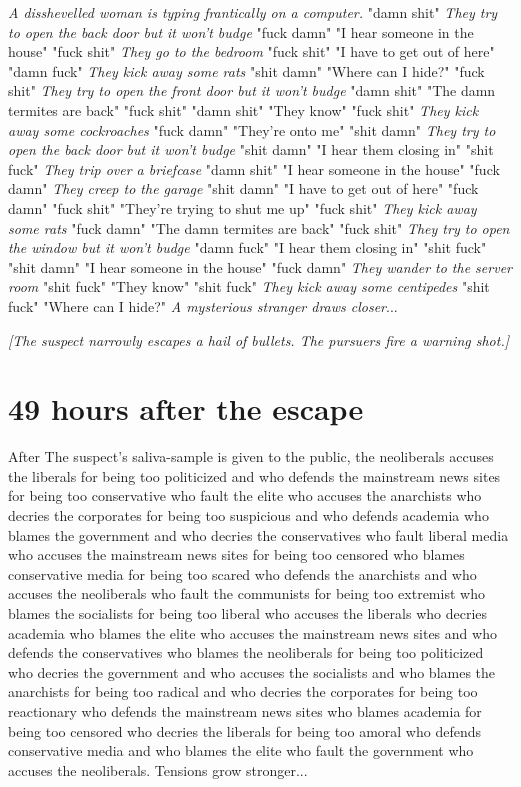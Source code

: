 \documentclass{report}
\begin{document}
\textit{A disshevelled woman is typing frantically on a computer.} "damn shit" \textit{They try to open the back door but it won't budge} "fuck damn" "I hear someone in the house" "fuck shit" \textit{They go to the bedroom} "fuck shit" "I have to get out of here" "damn fuck" \textit{They kick away some rats} "shit damn" "Where can I hide?" "fuck shit" \textit{They try to open the front door but it won't budge} "damn shit" "The damn termites are back" "fuck shit" \textit{} "damn shit" "They know" "fuck shit" \textit{They kick away some cockroaches} "fuck damn" "They're onto me" "shit damn" \textit{They try to open the back door but it won't budge} "shit damn" "I hear them closing in" "shit fuck" \textit{They trip over a briefcase} "damn shit" "I hear someone in the house" "fuck damn" \textit{They creep to the garage} "shit damn" "I have to get out of here" "fuck damn" \textit{} "fuck shit" "They're trying to shut me up" "fuck shit" \textit{They kick away some rats} "fuck damn" "The damn termites are back" "fuck shit" \textit{They try to open the window but it won't budge} "damn fuck" "I hear them closing in" "shit fuck" \textit{} "shit damn" "I hear someone in the house" "fuck damn" \textit{They wander to the server room} "shit fuck" "They know" "shit fuck" \textit{They kick away some centipedes} "shit fuck" "Where can I hide?" \textit{A mysterious stranger draws closer}...

\textit{[The suspect narrowly escapes a hail of bullets. The pursuers fire a warning shot.]}


\section*{49 \small{hours after the escape}}

After The suspect's saliva-sample is given to the public, the neoliberals accuses the liberals for being too politicized and who defends the mainstream news sites for being too conservative who fault the elite who accuses the anarchists who decries the corporates for being too suspicious and who defends academia who blames the government and who decries the conservatives who fault liberal media who accuses the mainstream news sites for being too censored who blames conservative media for being too scared who defends the anarchists and who accuses the neoliberals who fault the communists for being too extremist who blames the socialists for being too liberal who accuses the liberals who decries academia who blames the elite who accuses the mainstream news sites and who defends the conservatives who blames the neoliberals for being too politicized who decries the government and who accuses the socialists and who blames the anarchists for being too radical and who decries the corporates for being too reactionary who defends the mainstream news sites who blames academia for being too censored who decries the liberals for being too amoral who defends conservative media and who blames the elite who fault the government who accuses the neoliberals. Tensions grow stronger...
\end{document}
